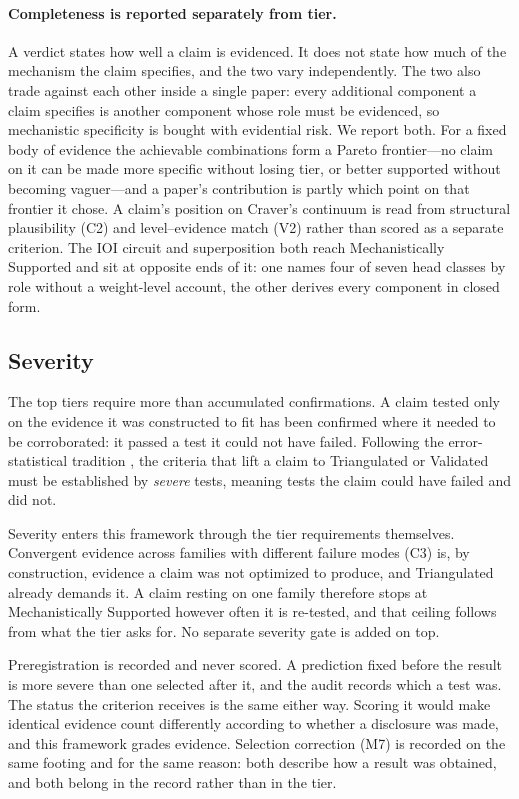 \documentclass{article}
\begin{document}
\paragraph{Completeness is reported separately from tier.} A verdict states how well a claim is evidenced. It does not state how much of the mechanism the claim specifies, and the two vary independently. The two also trade against each other inside a single paper: every additional component a claim specifies is another component whose role must be evidenced, so mechanistic specificity is bought with evidential risk. We report both. For a fixed body of evidence the achievable combinations form a Pareto frontier---no claim on it can be made more specific without losing tier, or better supported without becoming vaguer---and a paper's contribution is partly which point on that frontier it chose. A claim's position on Craver's continuum is read from structural plausibility (C2) and level--evidence match (V2) rather than scored as a separate criterion. The IOI circuit and superposition both reach Mechanistically Supported and sit at opposite ends of it: one names four of seven head classes by role without a weight-level account, the other derives every component in closed form.

\subsection{Severity}
\label{sec:severity}

The top tiers require more than accumulated confirmations. A claim tested only on
the evidence it was constructed to fit has been confirmed where it needed to be
corroborated: it passed a test it could not have failed. Following the
error-statistical tradition \citep{mayo2018statistical}, the criteria that lift a
claim to Triangulated or Validated must be established by \emph{severe} tests,
meaning tests the claim could have failed and did not.

Severity enters this framework through the tier requirements themselves.
Convergent evidence across families with different failure modes (C3) is, by
construction, evidence a claim was not optimized to produce, and Triangulated
already demands it. A claim resting on one family therefore stops at
Mechanistically Supported however often it is re-tested, and that ceiling follows
from what the tier asks for. No separate severity gate is added on top.

Preregistration is recorded and never scored. A prediction fixed before the
result is more severe than one selected after it, and the audit records which a
test was. The status the criterion receives is the same either way. Scoring it
would make identical evidence count differently according to whether a disclosure
was made, and this framework grades evidence. Selection correction (M7) is
recorded on the same footing and for the same reason: both describe how a result
was obtained, and both belong in the record rather than in the tier.
\end{document}
